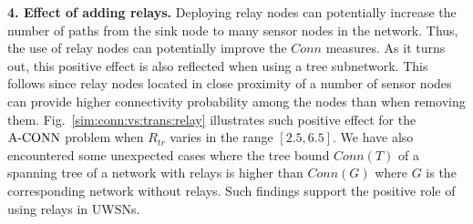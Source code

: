 {\bf 4. Effect of adding relays.}
%
Deploying relay nodes can potentially increase the number of paths
from the sink node to many sensor nodes in the network.
%
Thus, the use of relay nodes can potentially improve the $Conn$ measures.
%
As it turns out, this positive effect is also reflected when using
a tree subnetwork.
%
This follows since relay nodes located in close proximity of a number
of sensor nodes can provide higher connectivity probability 
among the nodes than when removing them.
%
Fig.~\ref{sim:conn:vs:trans:relay} illustrates such positive effect
for the ${\mathrm {A\mbox{-}CONN}}$ problem when $R_{tr}$ varies in the range $[2.5,6.5]$.
%
We have also encountered some unexpected cases where the tree bound
$Conn(T)$ of a spanning tree of a network with relays is higher
than $Conn(G)$ where $G$ is the corresponding network without relays.
%
Such findings support the positive role of using relays in UWSNs.






